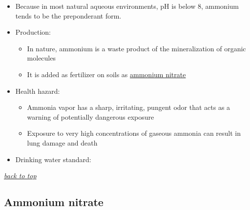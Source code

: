 \documentclass[]{book}
\providecommand{\tightlist}{%
  \setlength{\itemsep}{0pt}\setlength{\parskip}{0pt}}
\theoremstyle{definition}
\theoremstyle{definition}
\theoremstyle{definition}
\theoremstyle{remark}
\begin{document}
\begin{itemize}
\tightlist
\item
  Because in most natural aqueous environments, pH is below 8, ammonium
  tends to be the preponderant form.
\item
  Production:

  \begin{itemize}
  \tightlist
  \item
    In nature, ammonium is a waste product of the mineralization of
    organic molecules
  \item
    It is added as fertilizer on soils as
    \href{https://en.wikipedia.org/wiki/Ammonium_nitrate}{ammonium
    nitrate}
  \end{itemize}
\item
  Health hazard:

  \begin{itemize}
  \tightlist
  \item
    Ammonia vapor has a sharp, irritating, pungent odor that acts as a
    warning of potentially dangerous exposure
  \item
    Exposure to very high concentrations of gaseous ammonia can result
    in lung damage and death
  \end{itemize}
\item
  Drinking water standard:
\end{itemize}

\emph{\protect\hyperlink{top}{back to top}}

\subsection{Ammonium nitrate}\label{ammonium-nitrate}
\end{document}
